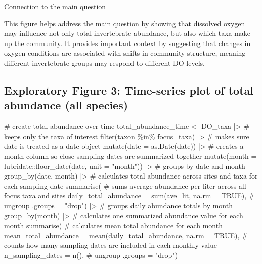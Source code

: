 \documentclass[
  letterpaper,
  DIV=11,
  numbers=noendperiod]{scrartcl}
\newenvironment{Shaded}{\begin{snugshade}}{\end{snugshade}}
\newcommand{\AttributeTok}[1]{\textcolor[rgb]{0.40,0.45,0.13}{#1}}
\newcommand{\CommentTok}[1]{\textcolor[rgb]{0.37,0.37,0.37}{#1}}
\newcommand{\ConstantTok}[1]{\textcolor[rgb]{0.56,0.35,0.01}{#1}}
\newcommand{\FunctionTok}[1]{\textcolor[rgb]{0.28,0.35,0.67}{#1}}
\newcommand{\NormalTok}[1]{\textcolor[rgb]{0.00,0.23,0.31}{#1}}
\newcommand{\OtherTok}[1]{\textcolor[rgb]{0.00,0.23,0.31}{#1}}
\newcommand{\SpecialCharTok}[1]{\textcolor[rgb]{0.37,0.37,0.37}{#1}}
\newcommand{\StringTok}[1]{\textcolor[rgb]{0.13,0.47,0.30}{#1}}
\begin{document}
Connection to the main question

This figure helps address the main question by showing that dissolved
oxygen may influence not only total invertebrate abundance, but also
which taxa make up the community. It provides important context by
suggesting that changes in oxygen conditions are associated with shifts
in community structure, meaning different invertebrate groups may
respond to different DO levels.

\subsection{Exploratory Figure 3: Time-series plot of total abundance
(all
species)}\label{exploratory-figure-3-time-series-plot-of-total-abundance-all-species}

\begin{Shaded}
\begin{Highlighting}[]
\CommentTok{\# create total abundance over time}
\NormalTok{total\_abundance\_time }\OtherTok{\textless{}{-}}\NormalTok{ DO\_taxa }\SpecialCharTok{|\textgreater{}}
  \CommentTok{\# keeps only the taxa of interest}
  \FunctionTok{filter}\NormalTok{(taxon }\SpecialCharTok{\%in\%}\NormalTok{ focus\_taxa) }\SpecialCharTok{|\textgreater{}}
  \CommentTok{\# makes sure date is treated as a date object}
  \FunctionTok{mutate}\NormalTok{(}\AttributeTok{date =} \FunctionTok{as.Date}\NormalTok{(date)) }\SpecialCharTok{|\textgreater{}}
  \CommentTok{\# creates a month column so close sampling dates are summarized together}
  \FunctionTok{mutate}\NormalTok{(}\AttributeTok{month =}\NormalTok{ lubridate}\SpecialCharTok{::}\FunctionTok{floor\_date}\NormalTok{(date, }\AttributeTok{unit =} \StringTok{"month"}\NormalTok{)) }\SpecialCharTok{|\textgreater{}}
  \CommentTok{\# groups by date and month}
  \FunctionTok{group\_by}\NormalTok{(date, month) }\SpecialCharTok{|\textgreater{}}
  \CommentTok{\# calculates total abundance across sites and taxa for each sampling date}
  \FunctionTok{summarise}\NormalTok{(}
    \CommentTok{\# sums average abundance per liter across all focus taxa and sites}
    \AttributeTok{daily\_total\_abundance =} \FunctionTok{sum}\NormalTok{(ave\_lit, }\AttributeTok{na.rm =} \ConstantTok{TRUE}\NormalTok{),}
    \CommentTok{\# ungroup}
    \AttributeTok{.groups =} \StringTok{"drop"}\NormalTok{) }\SpecialCharTok{|\textgreater{}}
  \CommentTok{\# groups daily abundance totals by month}
  \FunctionTok{group\_by}\NormalTok{(month) }\SpecialCharTok{|\textgreater{}}
  \CommentTok{\# calculates one summarized abundance value for each month}
  \FunctionTok{summarise}\NormalTok{(}
    \CommentTok{\# calculates mean total abundance for each month}
    \AttributeTok{mean\_total\_abundance =} \FunctionTok{mean}\NormalTok{(daily\_total\_abundance, }\AttributeTok{na.rm =} \ConstantTok{TRUE}\NormalTok{),}
    \CommentTok{\# counts how many sampling dates are included in each monthly value}
    \AttributeTok{n\_sampling\_dates =} \FunctionTok{n}\NormalTok{(),}
    \CommentTok{\# ungroup}
    \AttributeTok{.groups =} \StringTok{"drop"}\NormalTok{)}


\end{Highlighting}
\end{Shaded}
\end{document}
